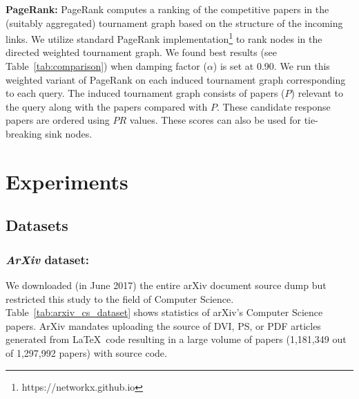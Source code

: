 \documentclass[runningheads]{llncs}
\begin{document}
\noindent \textbf{PageRank:}
PageRank computes a ranking of the competitive papers in the (suitably aggregated) tournament graph based on the structure of the incoming links. We utilize standard PageRank implementation\footnote{https://networkx.github.io} to rank nodes in the directed weighted tournament graph. We found best results (see Table~\ref{tab:comparison}) when damping factor ($\alpha$) is set at 0.90. We run this weighted variant of PageRank on each induced tournament graph corresponding to each query. The induced tournament graph consists of papers ($P$) relevant to the query along with the papers  compared with $P$. These candidate response papers are ordered using $PR$ values. These scores can also be used for tie-breaking sink nodes.

\section{Experiments}
\label{experiments}

\subsection{Datasets}
\label{dataset}

\subsubsection{\textit{ArXiv} dataset:}
We downloaded (in June 2017) the entire arXiv document source dump but
restricted this study to the field of Computer Science. %
Table~\ref{tab:arxiv_cs_dataset} shows statistics of arXiv's Computer Science papers.  ArXiv 
mandates uploading the source of DVI, PS, or PDF articles generated from \LaTeX\ code resulting in a large volume of papers (1,181,349 out of 1,297,992 papers) with source code.
\end{document}
